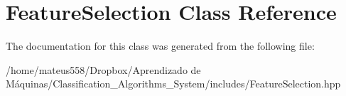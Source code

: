 \hypertarget{class_feature_selection}{}\section{Feature\+Selection Class Reference}
\label{class_feature_selection}


The documentation for this class was generated from the following file\+:\begin{DoxyCompactItemize}
\item 
/home/mateus558/\+Dropbox/\+Aprendizado de Máquinas/\+Classification\+\_\+\+Algorithms\+\_\+\+System/includes/Feature\+Selection.\+hpp\end{DoxyCompactItemize}
